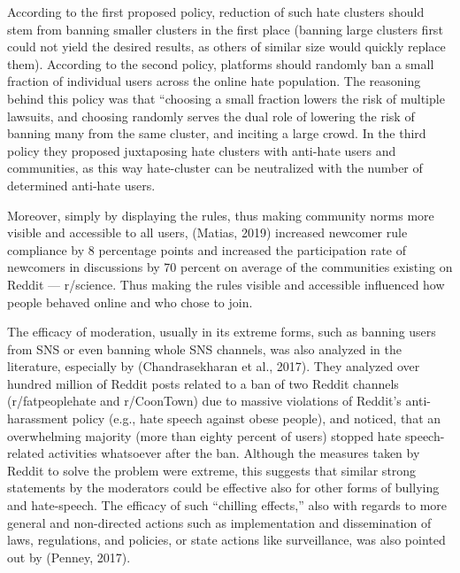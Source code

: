 \documentclass[10pt,dvipsnames]{scrartcl}
\begin{document}
According to the first proposed policy, reduction of such hate clusters
should stem from banning smaller clusters in the first place (banning
large clusters first could not yield the desired results, as others of
similar size would quickly replace them). According to the second
policy, platforms should randomly ban a small fraction of individual
users across the online hate population. The reasoning behind this
policy was that ``choosing a small fraction lowers the risk of multiple
lawsuits, and choosing randomly serves the dual role of lowering the
risk of banning many from the same cluster, and inciting a large crowd.
In the third policy they proposed juxtaposing hate clusters with
anti-hate users and communities, as this way hate-cluster can be
neutralized with the number of determined anti-hate users.

Moreover, simply by displaying the rules, thus making community norms
more visible and accessible to all users, (Matias, 2019) increased
newcomer rule compliance by 8 percentage points and increased the
participation rate of newcomers in discussions by 70 percent on average
of the communities existing on Reddit --- r/science. Thus making the
rules visible and accessible influenced how people behaved online and
who chose to join.

The efficacy of moderation, usually in its extreme forms, such as
banning users from SNS or even banning whole SNS channels, was also
analyzed in the literature, especially by (Chandrasekharan et al.,
2017). They analyzed over hundred million of Reddit posts related to a
ban of two Reddit channels (r/fatpeoplehate and r/CoonTown) due to
massive violations of Reddit's anti-harassment policy (e.g., hate speech
against obese people), and noticed, that an overwhelming majority (more
than eighty percent of users) stopped hate speech-related activities
whatsoever after the ban. Although the measures taken by Reddit to solve
the problem were extreme, this suggests that similar strong statements
by the moderators could be effective also for other forms of bullying
and hate-speech. The efficacy of such ``chilling effects,'' also with
regards to more general and non-directed actions such as implementation
and dissemination of laws, regulations, and policies, or state actions
like surveillance, was also pointed out by (Penney, 2017).
\end{document}
